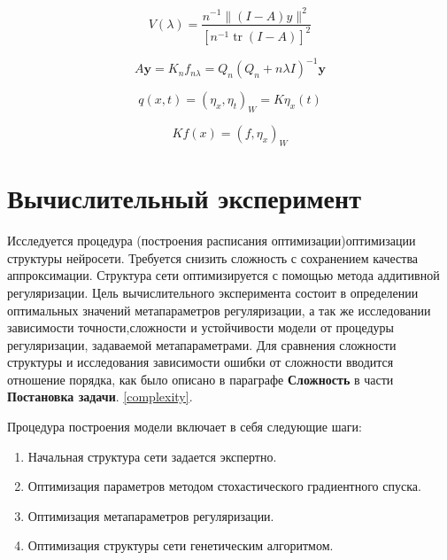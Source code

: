 \documentclass[12pt, twoside]{article}
\newenvironment{comment}{}{}
\begin{document}
\begin{comment}
    
    \begin{equation}
    V(\lambda)=\frac{n^{-1}\|(I-A) y\|^{2}}{\left[n^{-1} \operatorname{tr}(I-A)\right]^{2}}
    \end{equation}
    
    \begin{equation}
    A \boldsymbol{y}=K_{n} f_{n \lambda}=Q_{n}\left(Q_{n}+n \lambda I\right)^{-1} \boldsymbol{y}
    \end{equation}
    
    \begin{equation}
    q(x, t)=\left(\eta_{x}, \eta_{t}\right)_{W}=K \eta_{x}(t)
    \end{equation}
    
    \begin{equation}
    K f(x)=\left(f, \eta_{x}\right)_{W}
    \end{equation}

\end{comment}


\section{Вычислительный эксперимент}
Исследуется процедура (построения расписания оптимизации)оптимизации структуры нейросети. Требуется снизить сложность с сохранением качества аппроксимации. Структура сети оптимизируется с помощью метода аддитивной регуляризации. Цель вычислительного эксперимента состоит в определении оптимальных значений метапараметров регуляризации, а так же исследовании зависимости точности,сложности и устойчивости модели от процедуры регуляризации, задаваемой метапараметрами. Для сравнения сложности структуры и исследования зависимости ошибки от сложности вводится отношение порядка, как было описано в параграфе \textbf{Сложность} в части \textbf{Постановка задачи}. \ref{complexity}.

Процедура построения модели включает в себя \mbox{следующие} шаги:
\begin{enumerate}
\item
Начальная структура сети задается экспертно.
\item
Оптимизация параметров методом стохастического градиентного спуска.
\item
Оптимизация метапараметров регуляризации.
\item
Оптимизация структуры сети генетическим алгоритмом.
\end{enumerate}
\end{document}
